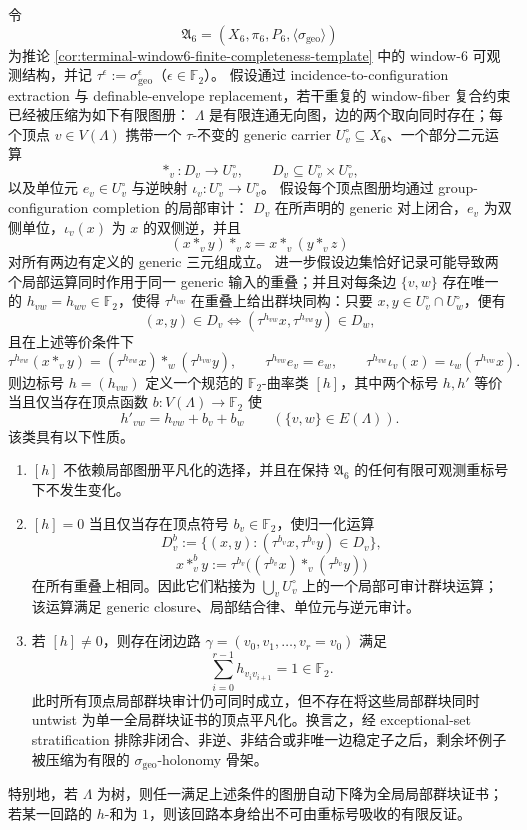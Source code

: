 \begin{theorem}\label{distill:hrushovski_zilber_zariski_geometries_and_elekes_szabo_group_extraction-group_chunk_reconstruction-window6-rigid-z2-curvature-gate}
令
\[
\mathfrak A_6=(X_6,\pi_6,P_6,\langle\sigma_{\mathrm{geo}}\rangle)
\]
为推论 \ref{cor:terminal-window6-finite-completeness-template} 中的 window-\(6\) 可观测结构，并记
\(\tau^\epsilon:=\sigma_{\mathrm{geo}}^\epsilon\)（\(\epsilon\in\mathbb F_2\)）。
假设通过 incidence-to-configuration extraction 与 definable-envelope replacement，若干重复的 window-fiber 复合约束已经被压缩为如下有限图册：
\(\Lambda\) 是有限连通无向图，边的两个取向同时存在；每个顶点 \(v\in V(\Lambda)\) 携带一个 \(\tau\)-不变的 generic carrier
\(U_v^\circ\subseteq X_6\)、一个部分二元运算
\[
*_v:D_v\longrightarrow U_v^\circ,
\qquad D_v\subseteq U_v^\circ\times U_v^\circ,
\]
以及单位元 \(e_v\in U_v^\circ\) 与逆映射 \(\iota_v:U_v^\circ\to U_v^\circ\)。
假设每个顶点图册均通过 group-configuration completion 的局部审计：
\(D_v\) 在所声明的 generic 对上闭合，\(e_v\) 为双侧单位，\(\iota_v(x)\) 为 \(x\) 的双侧逆，并且
\[
(x*_v y)*_v z=x*_v(y*_v z)
\]
对所有两边有定义的 generic 三元组成立。
进一步假设边集恰好记录可能导致两个局部运算同时作用于同一 generic 输入的重叠；并且对每条边 \(\{v,w\}\) 存在唯一的 \(h_{vw}=h_{wv}\in\mathbb F_2\)，使得 \(\tau^{h_{vw}}\) 在重叠上给出群块同构：只要 \(x,y\in U_v^\circ\cap U_w^\circ\)，便有
\[
(x,y)\in D_v
\Longleftrightarrow
(\tau^{h_{vw}}x,\tau^{h_{vw}}y)\in D_w,
\]
且在上述等价条件下
\[
\tau^{h_{vw}}(x*_v y)=(\tau^{h_{vw}}x)*_w(\tau^{h_{vw}}y),
\qquad
\tau^{h_{vw}}e_v=e_w,
\qquad
\tau^{h_{vw}}\iota_v(x)=\iota_w(\tau^{h_{vw}}x).
\]
则边标号 \(h=(h_{vw})\) 定义一个规范的 \(\mathbb F_2\)-曲率类
\([h]\)，其中两个标号 \(h,h'\) 等价当且仅当存在顶点函数
\(b:V(\Lambda)\to\mathbb F_2\) 使
\[
h'_{vw}=h_{vw}+b_v+b_w
\qquad(\{v,w\}\in E(\Lambda)).
\]
该类具有以下性质。
\begin{enumerate}
  \item \([h]\) 不依赖局部图册平凡化的选择，并且在保持 \(\mathfrak A_6\) 的任何有限可观测重标号下不发生变化。
  \item \([h]=0\) 当且仅当存在顶点符号 \(b_v\in\mathbb F_2\)，使归一化运算
  \[
  D_v^b:=\{(x,y):(\tau^{b_v}x,\tau^{b_v}y)\in D_v\},
  \]
  \[
  x*_v^b y:=\tau^{b_v}\bigl((\tau^{b_v}x)*_v(\tau^{b_v}y)\bigr)
  \]
  在所有重叠上相同。因此它们粘接为 \(\bigcup_v U_v^\circ\) 上的一个局部可审计群块运算；该运算满足 generic closure、局部结合律、单位元与逆元审计。
  \item 若 \([h]\ne0\)，则存在闭边路 \(\gamma=(v_0,v_1,\ldots,v_r=v_0)\) 满足
  \[
  \sum_{i=0}^{r-1}h_{v_i v_{i+1}}=1\in\mathbb F_2.
  \]
  此时所有顶点局部群块审计仍可同时成立，但不存在将这些局部群块同时 untwist 为单一全局群块证书的顶点平凡化。换言之，经 exceptional-set stratification 排除非闭合、非逆、非结合或非唯一边稳定子之后，剩余坏例子被压缩为有限的 \(\sigma_{\mathrm{geo}}\)-holonomy 骨架。
\end{enumerate}
特别地，若 \(\Lambda\) 为树，则任一满足上述条件的图册自动下降为全局局部群块证书；若某一回路的 \(h\)-和为 \(1\)，则该回路本身给出不可由重标号吸收的有限反证。
\end{theorem}
